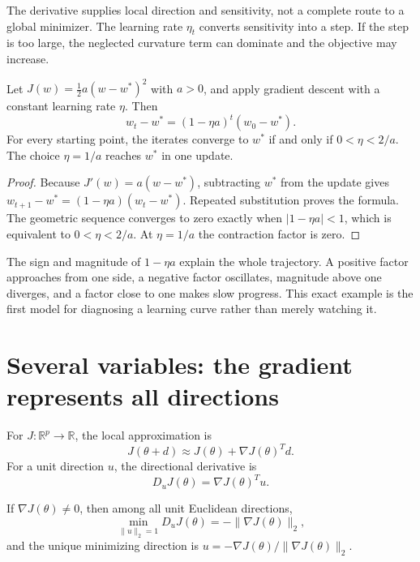 The derivative supplies local direction and sensitivity, not a complete route
to a global minimizer. The learning rate $\eta_t$ converts sensitivity into a
step. If the step is too large, the neglected curvature term can dominate and
the objective may increase.

\begin{theorem}
\label{thm:scalar-gd}
Let $J(w)=\tfrac12a(w-w^*)^2$ with $a>0$, and apply gradient descent with a
constant learning rate $\eta$. Then
\[
w_t-w^*=(1-\eta a)^t(w_0-w^*).
\]
For every starting point, the iterates converge to $w^*$ if and only if
$0<\eta<2/a$. The choice $\eta=1/a$ reaches $w^*$ in one update.
\end{theorem}

\begin{proof}
Because $J'(w)=a(w-w^*)$, subtracting $w^*$ from the update gives
$w_{t+1}-w^*=(1-\eta a)(w_t-w^*)$. Repeated substitution proves the formula.
The geometric sequence converges to zero exactly when
$|1-\eta a|<1$, which is equivalent to $0<\eta<2/a$. At $\eta=1/a$ the
contraction factor is zero.
\end{proof}

The sign and magnitude of $1-\eta a$ explain the whole trajectory. A positive
factor approaches from one side, a negative factor oscillates, magnitude above
one diverges, and a factor close to one makes slow progress. This exact example
is the first model for diagnosing a learning curve rather than merely watching
it.


\section{Several variables: the gradient represents all directions}

For $J:\mathbb{R}^p\rightarrow\mathbb{R}$, the local approximation is
\[
J(\theta+d)\approx J(\theta)+\nabla J(\theta)^Td.
\]
For a unit direction $u$, the directional derivative is
\[
D_uJ(\theta)=\nabla J(\theta)^Tu.
\]
\begin{theorem}
\label{thm:steepest-descent}
If $\nabla J(\theta)\ne0$, then among all unit Euclidean directions,
\[
\min_{\lVert u\rVert_2=1}D_uJ(\theta)
=-\lVert\nabla J(\theta)\rVert_2,
\]
and the unique minimizing direction is
$u=-\nabla J(\theta)/\lVert\nabla J(\theta)\rVert_2$.
\end{theorem}

